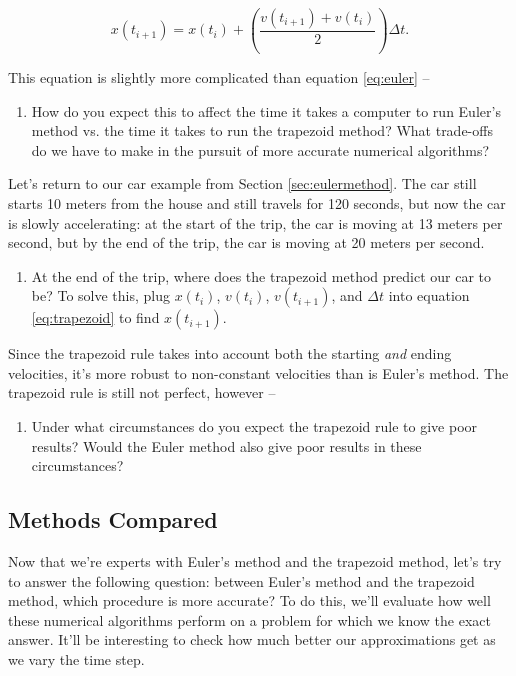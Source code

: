 \documentclass[11pt]{article}
\begin{document}
\begin{equation} \label{eq:trapezoid}
\boxed{x(t_{i+1}) = x(t_i) + \left(\frac{v(t_{i+1}) + v(t_i)}{2}\right) \Delta t}.
\end{equation}

This equation is slightly more complicated than equation \ref{eq:euler} -- 
\begin{enumerate}[resume]
    \item How do you expect this to affect the time it takes a computer to run Euler's method vs. the time it takes to run the trapezoid method? What trade-offs do we have to make in the pursuit of more accurate numerical algorithms?
\end{enumerate}

\noindent
Let's return to our car example from Section \ref{sec:eulermethod}. The car still starts 10 meters from the house and still travels for 120 seconds, but now the car is slowly accelerating: at the start of the trip, the car is moving at 13 meters per second, but by the end of the trip, the car is moving at 20 meters per second.
\begin{enumerate}[resume]
    \item At the end of the trip, where does the trapezoid method predict our car to be? To solve this, plug $x(t_i)$, $v(t_i)$, $v(t_{i+1})$, and $\Delta t$ into equation \ref{eq:trapezoid} to find $x(t_{i+1})$.
\end{enumerate}

\noindent
Since the trapezoid rule takes into account both the starting \textit{and} ending velocities, it's more robust to non-constant velocities than is Euler's method. The trapezoid rule is still not perfect, however -- 
\begin{enumerate}[resume]
    \item Under what circumstances do you expect the trapezoid rule to give poor results? Would the Euler method also give poor results in these circumstances?
\end{enumerate}

\subsection{Methods Compared}
Now that we're experts with Euler's method and the trapezoid method, let's try to answer the following question: between Euler's method and the trapezoid method, which procedure is more accurate? To do this, we'll evaluate how well these numerical algorithms perform on a problem for which we know the exact answer. It'll be interesting to check how much better our approximations get as we vary the time step. \vspace{\baselineskip}
\end{document}
